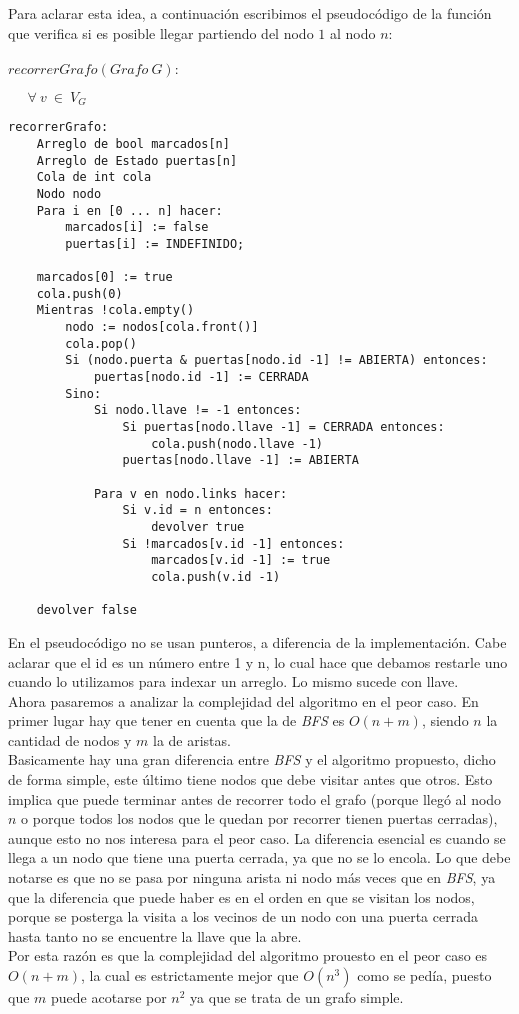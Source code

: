 Para aclarar esta idea, a continuación escribimos el pseudocódigo de la función que verifica si es posible llegar partiendo del nodo $1$ al nodo $n$: \\ \\
$recorrerGrafo(Grafo \: G):$

$\; \; \; \; \; \forall \: v \: \in \: V_G$
\begin{verbatim}
recorrerGrafo:  
    Arreglo de bool marcados[n]
    Arreglo de Estado puertas[n]
    Cola de int cola
    Nodo nodo
    Para i en [0 ... n] hacer:
        marcados[i] := false
        puertas[i] := INDEFINIDO;

    marcados[0] := true
    cola.push(0)
    Mientras !cola.empty()
        nodo := nodos[cola.front()]
        cola.pop()
        Si (nodo.puerta & puertas[nodo.id -1] != ABIERTA) entonces:
            puertas[nodo.id -1] := CERRADA
        Sino:
            Si nodo.llave != -1 entonces:
                Si puertas[nodo.llave -1] = CERRADA entonces:
                    cola.push(nodo.llave -1)
                puertas[nodo.llave -1] := ABIERTA
            
            Para v en nodo.links hacer:
                Si v.id = n entonces:
                	devolver true
                Si !marcados[v.id -1] entonces:
                    marcados[v.id -1] := true
                    cola.push(v.id -1)

    devolver false
\end{verbatim}

En el pseudocódigo no se usan punteros, a diferencia de la implementación. Cabe aclarar que el id es un número entre 1 y n, lo cual hace que debamos restarle uno cuando lo utilizamos para indexar un arreglo. Lo mismo sucede con llave. \\

Ahora pasaremos a analizar la complejidad del algoritmo en el peor caso. En primer lugar hay que tener en cuenta que la de \textit{BFS} es $O(n+m)$, siendo $n$ la cantidad de nodos y $m$ la de aristas. \\

Basicamente hay una gran diferencia entre \textit{BFS} y el algoritmo propuesto, dicho de forma simple, este último tiene nodos que debe visitar antes que otros. Esto implica que puede terminar antes de recorrer todo el grafo (porque llegó al nodo $n$ o porque todos los nodos que le quedan por recorrer tienen puertas cerradas), aunque esto no nos interesa para el peor caso. La diferencia esencial es cuando se llega a un nodo que tiene una puerta cerrada, ya que no se lo encola. Lo que debe notarse es que no se pasa por ninguna arista ni nodo más veces que en \textit{BFS}, ya que la diferencia que puede haber es en el orden en que se visitan los nodos, porque se posterga la visita a los vecinos de un nodo con una puerta cerrada hasta tanto no se encuentre la llave que la abre. \\

Por esta razón es que la complejidad del algoritmo prouesto en el peor caso es $O(n+m)$, la cual es estrictamente mejor que $O(n^3)$ como se pedía, puesto que $m$ puede acotarse por $n^2$ ya que se trata de un grafo simple. \\
